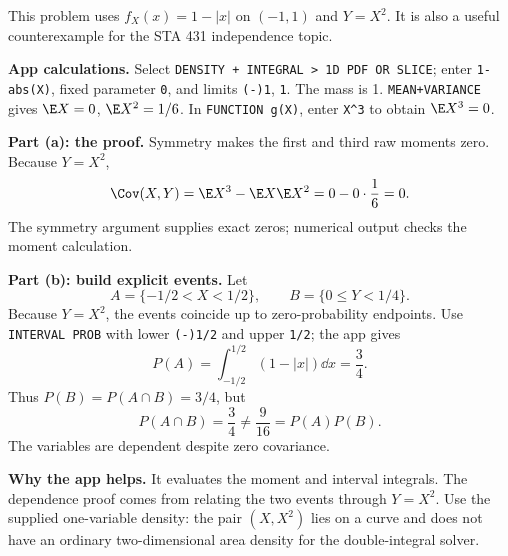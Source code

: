 This problem uses $f_X(x)=1-|x|$ on $(-1,1)$ and $Y=X^2$. It is also a useful counterexample for the STA 431 independence topic.

\textbf{App calculations.} Select \texttt{DENSITY + INTEGRAL > 1D PDF OR SLICE}; enter \texttt{1-abs(X)}, fixed parameter \texttt{0}, and limits \texttt{(-)1}, \texttt{1}. The mass is 1. \texttt{MEAN+VARIANCE} gives $\E X=0$, $\E X^2=1/6$. In \texttt{FUNCTION g(X)}, enter \texttt{X\^{}3} to obtain $\E X^3=0$.

\textbf{Part (a): the proof.} Symmetry makes the first and third raw moments zero. Because $Y=X^2$,
\[
\Cov(X,Y)=\E X^3-\E X\E X^2=0-0\cdot\frac16=0.
\]
The symmetry argument supplies exact zeros; numerical output checks the moment calculation.

\textbf{Part (b): build explicit events.} Let
\[
A=\{-1/2<X<1/2\},\qquad B=\{0\le Y<1/4\}.
\]
Because $Y=X^2$, the events coincide up to zero-probability endpoints. Use \texttt{INTERVAL PROB} with lower \texttt{(-)1/2} and upper \texttt{1/2}; the app gives
\[
P(A)=\int_{-1/2}^{1/2}(1-|x|)\dd x=\frac34.
\]
Thus $P(B)=P(A\cap B)=3/4$, but
\[
\boxed{P(A\cap B)=\frac34\ne\frac9{16}=P(A)P(B).}
\]
The variables are dependent despite zero covariance.

\textbf{Why the app helps.} It evaluates the moment and interval integrals. The dependence proof comes from relating the two events through $Y=X^2$. Use the supplied one-variable density: the pair $(X,X^2)$ lies on a curve and does not have an ordinary two-dimensional area density for the double-integral solver.
